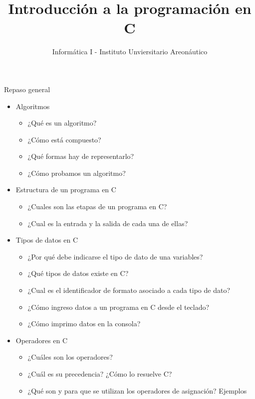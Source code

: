 \documentclass[xcolor=pdftex,table,11pt]{beamer}
\author{Informática I - Instituto Unviersitario Areonáutico}
\title{Introducción a la programación en C}
\begin{document}
\begin{frame}
\titlepage
\end{frame}

\begin{frame}
\tableofcontents
\end{frame}






\begin{frame}[allowframebreaks]{Repaso general}
	\begin{itemize}
	\item Algoritmos
		\begin{itemize}
		\item  ¿Qué es un algoritmo?
		\item  ¿Cómo está compuesto?
		\item  ¿Qué formas hay de representarlo?
		\item  ¿Cómo probamos un algoritmo?
		\end{itemize}
		
	  \item Estructura de un programa en C
		\begin{itemize}
		\item  ¿Cuales son las etapas de un programa en C?
		\item  ¿Cual es la entrada y la salida de cada una de ellas?
		\end{itemize}
		
	\item Tipos de datos en C
		\begin{itemize}
		\item  ¿Por qué debe indicarse el tipo de dato de una variables?
		\item  ¿Qué tipos de datos existe en C?
		\item  ¿Cual es el identificador de formato asociado a cada tipo de dato?
		\item  ¿Cómo ingreso datos a un programa en C desde el teclado?
		\item  ¿Cómo imprimo datos en la consola?
		\end{itemize}
		
		\item Operadores en C
		\begin{itemize}
		\item  ¿Cuáles son los operadores?
		\item  ¿Cuál es su precedencia? ¿Cómo lo resuelve C?
		\item  ¿Qué son y para que se utilizan los operadores de asignación? Ejemplos
		\end{itemize}
		

\end{itemize}
\end{frame}
\end{document}
